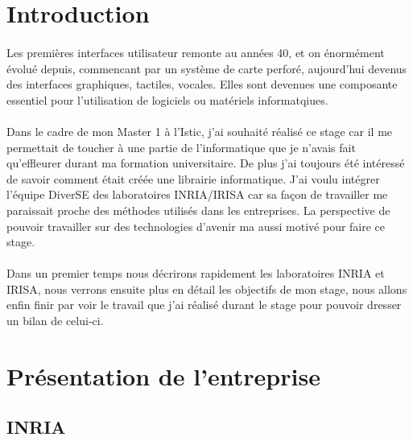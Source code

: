 \documentclass[11pt, a4paper, pdftex]{article}
\begin{document}
    \tableofcontents

    \newpage

    \section{Introduction}\label{sec:introduction}
        \paragraph{}
            Les premières interfaces utilisateur remonte au années 40, et on énormément évolué depuis, commencant par un système de carte perforé, aujourd'hui devenus des interfaces graphiques, tactiles, vocales.
            Elles sont devenues une composante essentiel pour l'utilisation de logiciels ou matériels informatqiues. %

        \paragraph{}
            Dans le cadre de mon Master 1 à l'Istic, j'ai souhaité réalisé ce stage car il me permettait de toucher à une partie de l'informatique que je n'avais
            fait qu'effleurer durant ma formation universitaire.
            De plus j'ai toujours été intéressé de savoir comment était créée une librairie informatique.
            J'ai voulu intégrer l'équipe DiverSE des laboratoires INRIA/IRISA car sa façon de travailler me paraissait proche des méthodes utilisés dans les entreprises.
            La perspective de pouvoir travailler sur des technologies d'avenir ma aussi motivé pour faire ce stage.

        \paragraph{}
            Dans un premier temps nous décrirons rapidement les laboratoires INRIA et IRISA, nous verrons ensuite plus en détail les objectifs de mon stage,
            nous allons enfin finir par voir le travail que j'ai réalisé durant le stage pour pouvoir dresser un bilan de celui-ci.
    \newpage
    \section{Présentation de l'entreprise}\label{sec:presentr}
    \vspace{1cm}
        \subsection{INRIA}\label{subsec:inria}
\end{document}
